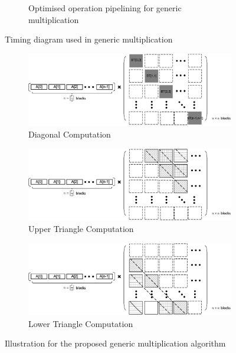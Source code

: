 \documentclass[runningheads]{llncs}
\begin{document}
\begin{figure}[!tb]
\begin{subfigure}[t]{0.47\textwidth}
\caption{Optimised operation pipelining for generic multiplication }
\label{fig:pipeline_gmul2}
\end{subfigure}
\caption{Timing diagram used in generic multiplication}
\end{figure}


\begin{figure}[!tb]
\centering
\begin{subfigure}[t]{0.45\textwidth}\centering
\includegraphics[width=\textwidth]{./fig/generic_mul_illustrate.eps}
\caption{Diagonal Computation}
\label{fig:gmul_ill1}
\end{subfigure}
\hspace{1em}
\begin{subfigure}[t]{0.45\textwidth}\centering
\includegraphics[width=\textwidth]{./fig/generic_mul_illustrate2.eps}
\caption{Upper Triangle Computation}
\label{fig:gmul_ill2}
\end{subfigure}
\hspace{1em}
\begin{subfigure}[t]{0.45\textwidth}\centering
\includegraphics[width=\textwidth]{./fig/generic_mul_illustrate3.eps}
\caption{Lower Triangle Computation}
\label{fig:gmul_ill3}
\end{subfigure}
\caption{Illustration for the proposed generic multiplication algorithm}
\end{figure}
\end{document}
